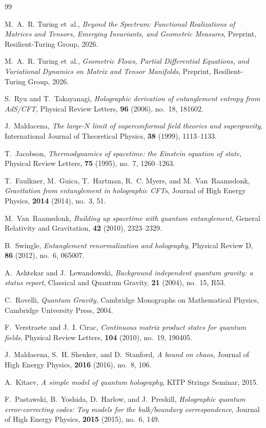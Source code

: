 \documentclass[11pt,a4paper,reqno]{amsart}
\theoremstyle{definition}
\numberwithin{equation}{section}
\begin{document}
\begin{thebibliography}{99}

M.~A.~R. Turing et~al.,
\emph{Beyond the Spectrum: Functional Realizations of Matrices and Tensors, Emerging Invariants, and Geometric Measures},
Preprint, Resilient-Turing Group, 2026.

M.~A.~R. Turing et~al.,
\emph{Geometric Flows, Partial Differential Equations, and Variational Dynamics on Matrix and Tensor Manifolds},
Preprint, Resilient-Turing Group, 2026.

S.~Ryu and T.~Takayanagi,
\emph{Holographic derivation of entanglement entropy from AdS/CFT},
Physical Review Letters, \textbf{96} (2006), no.~18, 181602.

J.~Maldacena,
\emph{The large-$N$ limit of superconformal field theories and supergravity},
International Journal of Theoretical Physics, \textbf{38} (1999), 1113--1133.

T.~Jacobson,
\emph{Thermodynamics of spacetime: the Einstein equation of state},
Physical Review Letters, \textbf{75} (1995), no.~7, 1260--1263.

T.~Faulkner, M.~Guica, T.~Hartman, R.~C. Myers, and M.~Van~Raamsdonk,
\emph{Gravitation from entanglement in holographic CFTs},
Journal of High Energy Physics, \textbf{2014} (2014), no.~3, 51.

M.~Van~Raamsdonk,
\emph{Building up spacetime with quantum entanglement},
General Relativity and Gravitation, \textbf{42} (2010), 2323--2329.

B.~Swingle,
\emph{Entanglement renormalization and holography},
Physical Review D, \textbf{86} (2012), no.~6, 065007.

A.~Ashtekar and J.~Lewandowski,
\emph{Background independent quantum gravity: a status report},
Classical and Quantum Gravity, \textbf{21} (2004), no.~15, R53.

C.~Rovelli,
\emph{Quantum Gravity},
Cambridge Monographs on Mathematical Physics, Cambridge University Press, 2004.

F.~Verstraete and J.~I. Cirac,
\emph{Continuous matrix product states for quantum fields},
Physical Review Letters, \textbf{104} (2010), no.~19, 190405.

J.~Maldacena, S.~H. Shenker, and D.~Stanford,
\emph{A bound on chaos},
Journal of High Energy Physics, \textbf{2016} (2016), no.~8, 106.

A.~Kitaev,
\emph{A simple model of quantum holography},
KITP Strings Seminar, 2015.

F.~Pastawski, B.~Yoshida, D.~Harlow, and J.~Preskill,
\emph{Holographic quantum error-correcting codes: Toy models for the bulk/boundary correspondence},
Journal of High Energy Physics, \textbf{2015} (2015), no.~6, 149.

\end{thebibliography}
\end{document}

